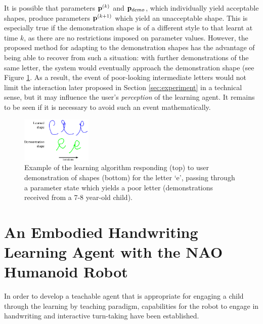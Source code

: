 \documentclass{sig-alternate}
\begin{document}
It is possible that parameters ${\bf p}^{(k)}$ and ${\bf p}_{demo}$, which
individually yield acceptable shapes, produce parameters ${\bf p}^{(k+1)}$
which yield an unacceptable shape. This is especially true if the demonstration
shape is of a different style to that learnt at time $k$, as there are no
restrictions imposed on parameter values. However, the proposed method for adapting to
the demonstration shapes has the advantage of being able to recover from such a situation: with further
demonstrations of the same letter, the system would eventually approach the
demonstration shape (see Figure \ref{fig:eDemo}. As a result, the event of poor-looking 
intermediate letters
would not limit the interaction later proposed in Section \ref{sec:experiment}
in a technical sense, but it may influence the user's \emph{perception} of the learning
agent. It remains to be seen if it is necessary to avoid such an event
mathematically.

\begin{figure}[thpb]
    \centering
    \includegraphics[width=0.3\textwidth]{figures/learningEdemo}
    \caption{\label{fig:eDemo}Example of the learning algorithm
    responding (top) to user demonstration of shapes (bottom) for the letter `e', passing through a parameter state which yields a poor letter (demonstrations received from a 7-8 year-old child).}
\end{figure}



\section{An Embodied Handwriting Learning Agent with the NAO Humanoid Robot}
\label{sec:robotWriting}

In order to develop a teachable agent that is appropriate for engaging a child
through the learning by teaching paradigm, 
capabilities for the robot to engage in handwriting and interactive turn-taking have been established.
\end{document}
